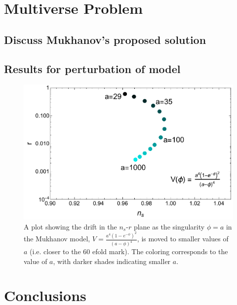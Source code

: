 \documentclass[a4paper,11pt]{article}
\def\nsr{$n_s$-$r$ }
\begin{document}
\FloatBarrier
\newpage
\section{Multiverse Problem}
\subsection{Discuss Mukhanov's proposed solution}
\subsection{Results for perturbation of model}

\begin{figure}[h!]
	\centering
	\includegraphics[width=\textwidth]{figures/Mukhanov.pdf}
	\caption[Drift in \nsr plane for Mukhanov model as the singularity moves to smaller $\phi$.]{A plot showing the drift in the \nsr plane as the singularity $\phi=a$ in the Mukhanov model, $V=\tfrac{a^4(1-e^{-\phi})^2}{(a-\phi)^4}$, is moved to smaller values of $a$ (i.e. closer to the 60 efold mark). The coloring corresponds to the value of $a$, with darker shades indicating smaller $a$.}
	\label{fig:LFP_Rsq_varyaf_drift}
\end{figure}

\FloatBarrier
\newpage
\section{Conclusions}



\newpage


\end{document}
